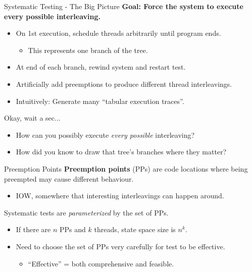 \documentclass[xcolor=dvipsnames]{beamer}
\begin{document}
\begin{frame}{Systematic Testing - The Big Picture}
	\textbf{Goal: Force the system to execute every possible interleaving.}
	\begin{itemize}
		\item On 1st execution, schedule threads arbitrarily until program ends.
			\begin{itemize}
				\item This represents one branch of the tree.
			\end{itemize}
		\item At end of each branch, rewind system and restart test.
		\item Artificially add preemptions to produce different thread interleavings.
		\item Intuitively: Generate many ``tabular execution traces''.
	\end{itemize}
	\pause
	\linegap

	Okay, wait a sec...
	\begin{itemize}
		\item How can you possibly execute {\em every possible} interleaving?
		\item How did you know to draw that tree's branches where they matter?
	\end{itemize}
\end{frame}

\begin{frame}{Preemption Points}
	\textbf{Preemption points} (PPs) are code locations where being preempted may cause different behaviour.
	\begin{itemize}
		\item IOW, somewhere that interesting interleavings can happen around.
	\end{itemize}
	\linegap

	Systematic tests are {\em parameterized} by the set of PPs.
	\begin{itemize}
		\item If there are $n$ PPs and $k$ threads, state space size is $n^k$.
		\item Need to choose the set of PPs very carefully for test to be effective.
		\begin{itemize}
			\item ``Effective'' = both comprehensive and feasible.
		\end{itemize}
	\end{itemize}
\end{frame}
\end{document}
